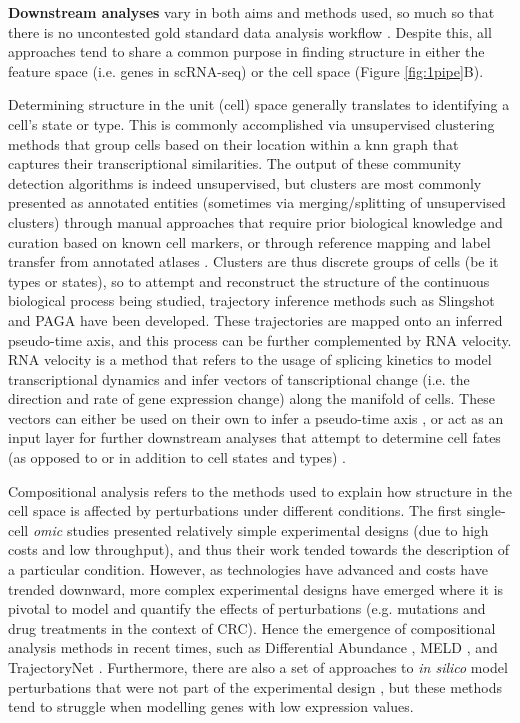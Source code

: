 \textbf{Downstream analyses} vary in both aims and methods used, so much so that there is no uncontested gold standard data analysis workflow \cite{slovin_single-cell_2021}. Despite this, all approaches tend to share a common purpose in finding structure in either the feature space (i.e. genes in scRNA-seq) or the cell space (Figure \ref{fig:1pipe}B).

Determining structure in the unit (cell) space generally translates to identifying a cell's state or type. This is commonly accomplished via unsupervised clustering methods that group cells based on their location within a \acrfull{knn} graph that captures their transcriptional similarities. The output of these community detection algorithms \cite{blondel_fast_2008,traag_louvain_2019} is indeed unsupervised, but clusters are most commonly presented as annotated entities (sometimes via merging/splitting of unsupervised clusters) through manual approaches that require prior biological knowledge and curation based on known cell markers, or through reference mapping and label transfer from annotated atlases \cite{lotfollahi_mapping_2022}. Clusters are thus discrete groups of cells (be it types or states), so to attempt and reconstruct the structure of the continuous biological process being studied, trajectory inference methods such as Slingshot \cite{street_slingshot_2018} and PAGA \cite{wolf_paga_2019} have been developed. These trajectories are mapped onto an inferred pseudo-time axis, and this process can be further complemented by RNA velocity. RNA velocity \cite{la_manno_rna_2018} is a method that refers to the usage of splicing kinetics to model transcriptional dynamics and infer vectors of tanscriptional change (i.e. the direction and rate of gene expression change) along the manifold of cells. These vectors can either be used on their own to infer a pseudo-time axis \cite{bergen_generalizing_2020}, or act as an input layer for further downstream analyses that attempt to determine cell fates (as opposed to or in addition to cell states and types) \cite{lange_cellrank_2022}.

Compositional analysis refers to the methods used to explain how structure in the cell space is affected by perturbations under different conditions. The first single-cell \emph{omic} studies presented relatively simple experimental designs (due to high costs and low throughput), and thus their work tended towards the description of a particular condition. However, as technologies have advanced and costs have trended downward, more complex experimental designs have emerged where it is pivotal to model and quantify the effects of perturbations (e.g. mutations and drug treatments in the context of CRC). Hence the emergence of compositional analysis methods in recent times, such as Differential Abundance \cite{lun_testing_2017,dann_differential_2022}, MELD \cite{burkhardt_quantifying_2021}, and TrajectoryNet \cite{tong_trajectorynet_2020}. Furthermore, there are also a set of approaches to \emph{in silico} model perturbations that were not part of the experimental design \cite{lotfollahi_scgen_2019,yuan_cellbox_2021,lotfollahi_learning_2021}, but these methods tend to struggle when modelling genes with low expression values.

